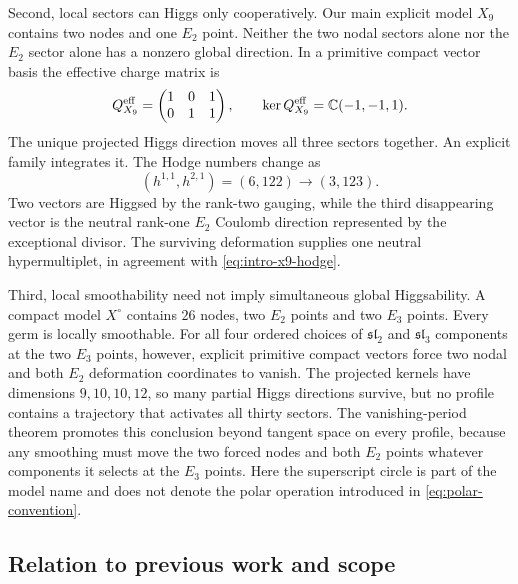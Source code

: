 Second, local sectors can Higgs only cooperatively. Our main explicit model $X_9$
contains two nodes and one $E_2$ point. Neither the two nodal sectors alone nor
the $E_2$ sector alone has a nonzero global direction. In a primitive compact
vector basis the effective charge matrix is
\begin{equation}
 Q_{X_9}^{\mathrm{eff}}=
 \begin{pmatrix}1&0&1\\0&1&1\end{pmatrix},
 \qquad
 \ker Q_{X_9}^{\mathrm{eff}}=\mathbb C(-1,-1,1).
 \label{eq:intro-x9}
\end{equation}
The unique projected Higgs direction moves all three sectors together. An
explicit family integrates it. The Hodge numbers change as
\begin{equation}
 (h^{1,1},h^{2,1})=(6,122)\longrightarrow(3,123).
 \label{eq:intro-x9-hodge}
\end{equation}
Two vectors are Higgsed by the rank-two gauging, while the third disappearing
vector is the neutral rank-one $E_2$ Coulomb direction represented by the
exceptional divisor. The surviving deformation supplies one neutral
hypermultiplet, in agreement with \eqref{eq:intro-x9-hodge}.

Third, local smoothability need not imply simultaneous global Higgsability. A
compact model $X^{\circ}$ contains $26$ nodes, two $E_2$ points and two $E_3$
points. Every germ is locally smoothable. For all four ordered choices of
$\mathfrak{sl}_2$ and $\mathfrak{sl}_3$ components at the two $E_3$ points,
however, explicit primitive compact vectors force two nodal and
both $E_2$ deformation coordinates to vanish. The projected kernels have
dimensions $9,10,10,12$, so many partial Higgs directions survive, but no
profile contains a trajectory that activates all thirty sectors. The
vanishing-period theorem promotes this conclusion beyond tangent space on
every profile, because any smoothing must move the two forced nodes and both
$E_2$ points whatever components it selects at the $E_3$ points.
Here the superscript circle is part of the model name and does not denote the
polar operation introduced in \eqref{eq:polar-convention}.

\subsection*{Relation to previous work and scope}

